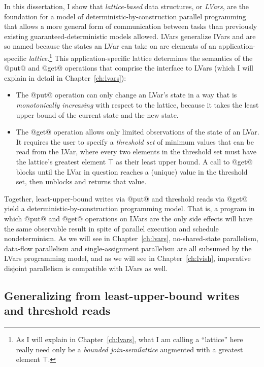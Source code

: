 In this dissertation, I show that \emph{lattice-based} data
structures, or \emph{LVars}, are the foundation for a model of
deterministic-by-construction parallel programming that allows a more
general form of communication between tasks than previously existing
guaranteed-deterministic models allowed.  LVars generalize IVars and
are so named because the states an LVar can take on are elements of an
application-specific \emph{lattice}.\footnote{As I will explain in
  Chapter~\ref{ch:lvars}, what I am calling a ``lattice'' here really
  need only be a {\em bounded join-semilattice} augmented with a
  greatest element $\top$.}  This application-specific lattice
determines the semantics of the @put@ and @get@ operations that
comprise the interface to LVars (which I will explain in detail in
Chapter~\ref{ch:lvars}):
\begin{itemize}
\item The @put@ operation can only change an LVar's state in a way
  that is {\em monotonically increasing} with respect to the lattice,
  because it takes the least upper bound of the current state and the
  new state.
\item The @get@ operation allows only limited observations of the
  state of an LVar.  It requires the user to specify a \emph{threshold
    set} of minimum values that can be read from the LVar, where every
  two elements in the threshold set must have the lattice's greatest
  element $\top$ as their least upper bound.  A call to @get@ blocks until the
  LVar in question reaches a (unique) value in the threshold set, then
  unblocks and returns that value.
\end{itemize}
Together, least-upper-bound writes via @put@ and threshold reads via
@get@ yield a deterministic-by-construction programming model.  That
is, a program in which @put@ and @get@ operations on LVars are the
only side effects will have the same observable result in spite of
parallel execution and schedule nondeterminism.   As we will see in
Chapter~\ref{ch:lvars}, no-shared-state parallelism, data-flow
parallelism and single-assignment parallelism are all subsumed by the
LVars programming model, and as we will see in
Chapter~\ref{ch:lvish},
imperative disjoint parallelism is compatible with LVars as well.

\subsection{Generalizing from least-upper-bound writes and threshold reads}\label{subsection:intro-generalizing}

